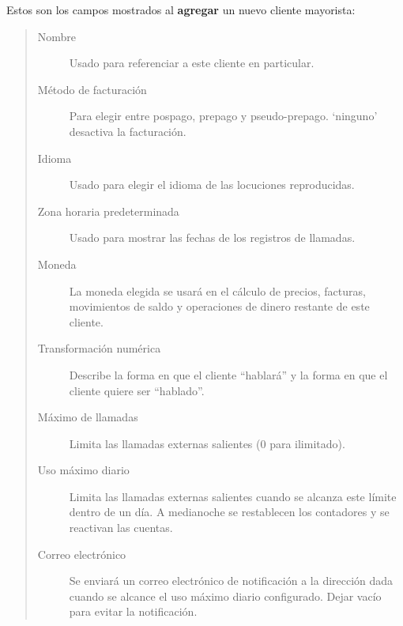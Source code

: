 \documentclass[letterpaper,10pt,spanish]{sphinxmanual}
\begin{document}
Estos son los campos mostrados al \textbf{agregar} un nuevo cliente mayorista:
\begin{quote}
\begin{description}
\item[{Nombre}] \leavevmode
Usado para referenciar a este cliente en particular.

\item[{Método de facturación}] \leavevmode
Para elegir entre pospago, prepago y pseudo-prepago. `ninguno' desactiva la facturación.

\item[{Idioma}] \leavevmode
Usado para elegir el idioma de las locuciones reproducidas.

\item[{Zona horaria predeterminada}] \leavevmode
Usado para mostrar las fechas de los registros de llamadas.

\item[{Moneda}] \leavevmode
La moneda elegida se usará en el cálculo de precios, facturas, movimientos de saldo y operaciones de dinero restante de este cliente.

\item[{Transformación numérica}] \leavevmode
Describe la forma en que el cliente ``hablará'' y la forma en que el cliente quiere ser ``hablado''.

\item[{Máximo de llamadas}] \leavevmode
Limita las llamadas externas salientes (0 para ilimitado).

\item[{Uso máximo diario}] \leavevmode
Limita las llamadas externas salientes cuando se alcanza este límite dentro de un día. A medianoche se restablecen los contadores y se reactivan las cuentas.

\item[{Correo electrónico}] \leavevmode
Se enviará un correo electrónico de notificación a la dirección dada cuando se alcance el uso máximo diario configurado. Dejar vacío para evitar la notificación.

\end{description}
\end{quote}
\end{document}
